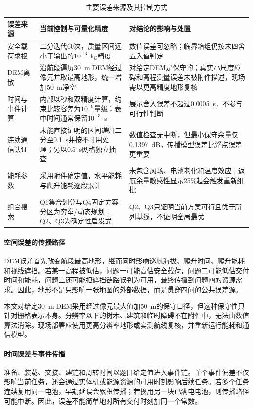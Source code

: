 \begin{table}[htbp]
\centering
\caption{主要误差来源及其控制方式}\label{tab:error-analysis}
\small
\begin{tabularx}{\textwidth}{>{\raggedright\arraybackslash}p{2.5cm}YY}
\toprule
误差来源 & 当前控制与可量化精度 & 对结论的影响与处置\\
\midrule
安全载荷求根 & 二分迭代60次，质量区间远小于输出的$10^{-3}$~kg精度 & 数值误差可忽略；临界箱组仍按未四舍五入值判定\\
DEM离散 & 沿航段遍历30~m DEM经过像元并取最高地形，统一增加50~m净空 & 对给定DEM是保守的；真实小尺度障碍和高程测量误差未被附件描述，现场需以更高精度地形复核\\
时间与事件计算 & 内部以秒和双精度计算，约束比较容差为$10^{-9}$量级；表中时间通常保留$10^{-3}$~s & 展示舍入误差不超过0.0005~s，不参与可行性判断\\
连续通信认证 & 未能直接证明的区间递归二分至0.1~s并按不可用处理；另以0.5~s网格独立抽查 & 数值检查无中断，但最小保守余量仅0.1397~dB，传播模型误差比浮点误差更重要\\
能耗参数 & 采用附件确定值，水平能耗与爬升能耗逐段累计 & 未包含风场、电池老化和温度效应；返航余量敏感性显示25\%起会触发重新组批\\
组合搜索 & Q1集合划分与Q4固定方案分区为穷举/动态规划；Q2、Q3为确定性启发式 & Q2、Q3只证明当前方案可行且优于所列基线，不证明全局最优\\
\bottomrule
\end{tabularx}
\end{table}

\paragraph{空间误差的传播路径}
DEM误差首先改变航段最高地形，继而同时影响巡航海拔、爬升时间、爬升能耗和视线遮挡。若某一高程被低估，问题一可能高估安全载荷，问题二可能低估交付时间和能耗，问题三还可能把遮挡链路误判为可用，最终传播到问题四的资源需求。因此，地形不是只影响一张地图的外部数据，而是贯穿四问的公共误差源。

本文对给定30~m DEM采用经过像元最大值加50~m的保守口径，但这种保守性只针对栅格表示本身。分辨率以下的树木、建筑和临时障碍不在附件中，无法由数值算法消除。现场部署应使用更高分辨率地形或实测航线复核，并重新运行能耗和通信模型。

\paragraph{时间误差与事件传播}
准备、装载、交接、建链和周转时间以题目给定值进入事件链。单个事件偏差不仅影响当前任务，还会通过实体机或能源资源的可用时刻影响后续任务。若多个任务连续复用同一电池，早期延误会累积传播；若换用另一块已满电电池，则传播路径可能中断。因此，误差不能简单地对所有交付时刻加同一个常数。

